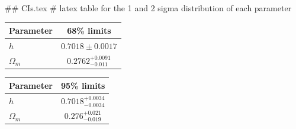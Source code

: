 ## CIs.tex
# latex table for the 1 and 2 sigma distribution of each parameter

\begin{tabular} { l  c}
 Parameter &  68\% limits\\
\hline
{\boldmath$h              $} & $0.7018\pm 0.0017          $\\
{\boldmath$\Omega_m       $} & $0.2762^{+0.0091}_{-0.011} $\\
\hline
\end{tabular}

\begin{tabular} { l  c}
 Parameter &  95\% limits\\
\hline
{\boldmath$h              $} & $0.7018^{+0.0034}_{-0.0034}$\\
{\boldmath$\Omega_m       $} & $0.276^{+0.021}_{-0.019}   $\\
\hline
\end{tabular}
